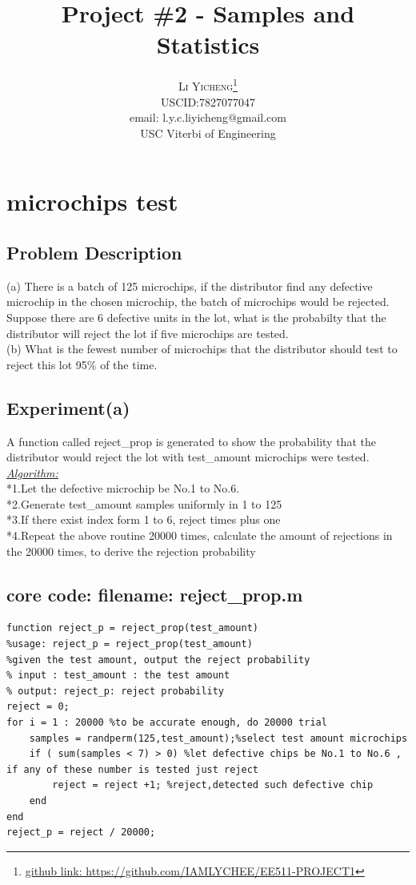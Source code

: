 \documentclass[twoside]{article}
\title{\vspace{-15mm}\fontsize{24pt}{10pt}\selectfont\textbf{Project \#2 - Samples and Statistics }} %
\author{
\large
\textsc{Li Yicheng}\thanks{\href{https://github.com/IAMLYCHEE/EE511-PROJECT3}{github link: https://github.com/IAMLYCHEE/EE511-PROJECT1} }\\[2mm] %
\normalsize USCID:7827077047\\
\normalsize email: l.y.c.liyicheng@gmail.com \\ %
\normalsize USC Viterbi of Engineering
\vspace{-5mm}
}
\date{}
\begin{document}
\maketitle %

\thispagestyle{fancy} %
\section{microchips test}
\subsection{\normalsize{Problem Description}}
(a) There is a batch of 125 microchips, if the distributor find any defective microchip in the chosen microchip, the batch of microchips would be rejected. Suppose there are 6 defective units in the lot, what is the probabilty that the distributor will reject the lot if five microchips are tested.\\
(b) What is the fewest number of microchips that the distributor should test to reject this lot 95\% of the time.\\
\subsection {\normalsize{Experiment(a)}}
A function called reject\_prop is generated to show the probability that the distributor would reject the lot with test\_amount microchips were tested.\\[10pt]
\underline{\emph{Algorithm:}} \\[10pt]
*1.Let the defective microchip be No.1 to No.6.\\
*2.Generate test\_amount samples uniformly in 1 to 125\\
*3.If there exist index form 1 to 6, reject times plus one\\
*4.Repeat the above routine 20000 times, calculate the amount of rejections in the 20000 times, to derive the rejection probability\\

\subsection{\normalsize{core code: filename: reject\_prop.m}}
\begin{lstlisting}
function reject_p = reject_prop(test_amount)
%usage: reject_p = reject_prop(test_amount)
%given the test amount, output the reject probability
% input : test_amount : the test amount
% output: reject_p: reject probability
reject = 0;
for i = 1 : 20000 %to be accurate enough, do 20000 trial
    samples = randperm(125,test_amount);%select test amount microchips 
    if ( sum(samples < 7) > 0) %let defective chips be No.1 to No.6 , if any of these number is tested just reject
        reject = reject +1; %reject,detected such defective chip
    end
end
reject_p = reject / 20000;
\end{lstlisting}
\end{document}
